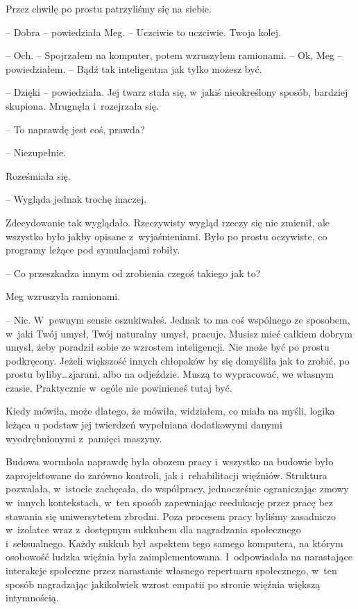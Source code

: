 \documentclass[oneside,polish,11pt,sfheadings]{mwbk}
\begin{document}
Przez chwilę po prostu patrzyliśmy się na siebie.

-- Dobra -- powiedziała Meg. -- Uczciwie to uczciwie. Twoja kolej.

-- Och. -- Spojrzałem na komputer, potem wzruszyłem ramionami. -- Ok, Meg -- powiedziałem. -- Bądź tak inteligentna jak tylko możesz być.

-- Dzięki -- powiedziała. Jej twarz stała się, w~jakiś nieokreślony
sposób, bardziej skupiona. Mrugnęła i~rozejrzała się.

-- To naprawdę jest coś, prawda?

-- Niezupełnie.

Roześmiała się. 

-- Wygląda jednak trochę inaczej.

Zdecydowanie tak wyglądało. Rzeczywisty wygląd rzeczy się nie zmienił,
ale wszystko było jakby opisane z~wyjaśnieniami. Było po prostu
oczywiste, co programy leżące pod symulacjami robiły.

-- Co przeszkadza innym od zrobienia czegoś takiego jak to?

Meg wzruszyła ramionami. 

-- Nic. W~pewnym sensie oszukiwałeś. Jednak to
ma coś wspólnego ze sposobem, w~jaki Twój umysł, Twój naturalny umysł,
pracuje. Musisz mieć całkiem dobrym umysł, żeby poradził sobie ze
wzrostem inteligencji. Nie może być po prostu podkręcony. Jeżeli
większość innych chłopaków by się domyśliła jak to zrobić, po prostu
byliby\ldots zjarani, albo na odjeździe. Muszą to wypracować, we własnym
czasie. Praktycznie w~ogóle nie powinieneś tutaj być.

Kiedy mówiła, może dlatego, że mówiła, widziałem, co miała na myśli,
logika leżąca u podstaw jej twierdzeń wypełniana dodatkowymi danymi
wyodrębnionymi z~pamięci maszyny.

Budowa wormhola naprawdę była obozem pracy i~wszystko na budowie było
zaprojektowane do zarówno kontroli, jak i~rehabilitacji więźniów.
Struktura pozwalała, w~istocie zachęcała, do współpracy, jednocześnie
ograniczając zmowy w~innych kontekstach, w~ten sposób zapewniając
reedukację przez pracę bez stawania się uniwersytetem zbrodni. Poza
procesem pracy byliśmy zasadniczo w~izolatce wraz z~dostępnym sukkubem
dla nagradzania społecznego i~seksualnego. Każdy sukkub był aspektem
tego samego komputera, na którym osobowość ludzka więźnia była
zaimplementowana. I~odpowiadała na narastające interakcje społeczne
przez narastanie własnego repertuaru społecznego, w~ten sposób
nagradzając jakikolwiek wzrost empatii po stronie więźnia większą
intymnością.
\end{document}
